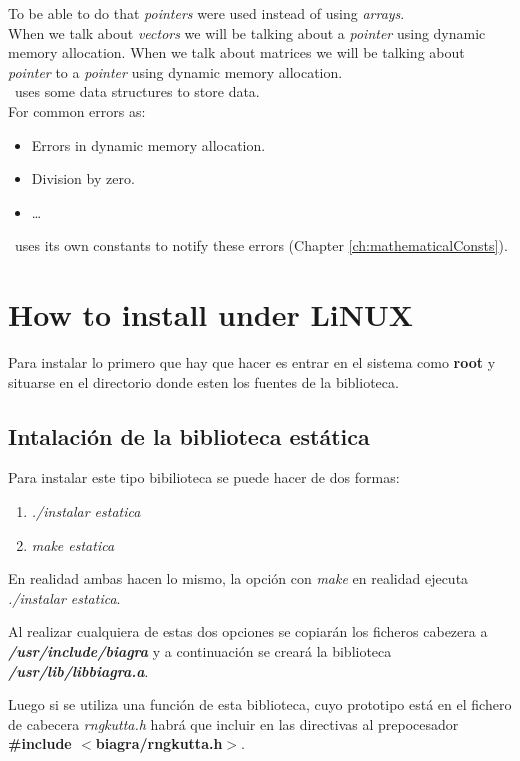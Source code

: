 To be able to do that \emph{pointers} were used instead of using \emph{arrays}.\\

When we talk about \emph{vectors} we will be talking about a \emph{pointer} using dynamic memory allocation. When we talk about matrices we will be talking about \emph{pointer} to a \emph{pointer} using dynamic memory allocation.\\

\BI\ uses some data structures to store data.\\

For common errors as:

\begin{itemize}
\item Errors in dynamic memory allocation.
\item Division by zero.
\item \ldots
\end{itemize}

\BI\ uses its own constants to notify these errors (Chapter \ref{ch:mathematicalConsts}).\\

\section{How to install \BI under LiNUX}

Para instalar \BI lo primero que hay que hacer es entrar en el sistema
como \textbf{root} y situarse en el directorio donde esten los fuentes
de la biblioteca.

\subsection{Intalaci\'on de la biblioteca \BI est\'atica}
Para instalar este tipo bibilioteca se puede hacer de dos formas:

\begin{enumerate}
\item \emph{./instalar estatica}
\item \emph{make estatica}
\end{enumerate}

En realidad ambas hacen lo mismo, la opci\'on con \emph{make} en realidad 
ejecuta \emph{./instalar estatica}.\newline

Al realizar cualquiera de estas dos opciones se copiar\'an los ficheros
cabezera a \emph{\textbf{/usr/include/biagra}} y a continuaci\'on se crear\'a la
biblioteca\\ \emph{\textbf{/usr/lib/libbiagra.a}}.\newline

Luego si se utiliza una funci\'on de esta biblioteca, cuyo prototipo est\'a en 
el fichero de cabecera \emph{rngkutta.h} habr\'a que incluir en las directivas 
al prepocesador \textbf{\#include $<$biagra/rngkutta.h$>$}.
